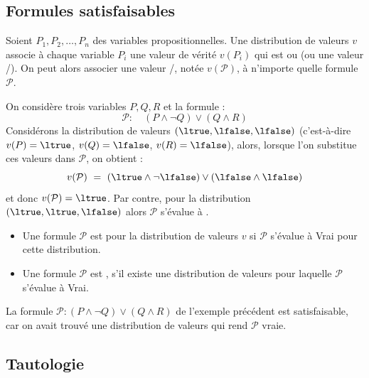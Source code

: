 \documentclass[11pt,class=report,crop=false]{standalone}
\begin{document}
\subsection{Formules satisfaisables}

Soient $P_1, P_2,\ldots, P_n$ des variables propositionnelles.
Une distribution de valeurs $v$ associe à chaque variable $P_i$ une valeur de vérité $v(P_i)$ qui est \ltrue{} ou \lfalse{} (ou une valeur \lzero/\lone).
On peut alors associer une valeur \ltrue/\lfalse, notée $v(\mathcal{P})$, à n'importe quelle formule $\mathcal{P}$.

\begin{exemple}
On considère trois variables $P, Q, R$ et la formule :
\[ \mathcal{P} : \quad (P \land \lnot Q) \lor (Q \land R) \]
Considérons la distribution de valeurs $(\ltrue, \lfalse, \lfalse)$ (c'est-à-dire $v(P) = \ltrue$, $v(Q)=\lfalse$, $v(R)=\lfalse$), alors, lorsque l'on substitue ces valeurs dans $\mathcal{P}$, on obtient :
\[ v(\mathcal{P}) \ = \  (\ltrue \land \lnot \lfalse) \lor (\lfalse \land \lfalse) \]
et donc $v(\mathcal{P}) = \ltrue$.
Par contre, pour la distribution $(\ltrue,\ltrue,\lfalse)$ alors $\mathcal{P}$ s'évalue à \lfalse.
\end{exemple}

\begin{definition}
	\sauteligne
	\begin{itemize}
		\item Une formule $\mathcal{P}$ est  pour la distribution de valeurs $v$ si $\mathcal{P}$ s'évalue à Vrai pour cette distribution. 
		
		\item Une formule $\mathcal{P}$ est , s'il existe une distribution de valeurs pour laquelle $\mathcal{P}$ s'évalue à Vrai.

	\end{itemize}	
\end{definition}


La formule $\mathcal{P} :  (P \land \lnot Q) \lor (Q \land R)$ de l'exemple précédent est satisfaisable, car on avait trouvé une distribution de valeurs qui rend $\mathcal{P}$ vraie. 


\subsection{Tautologie}
\end{document}
